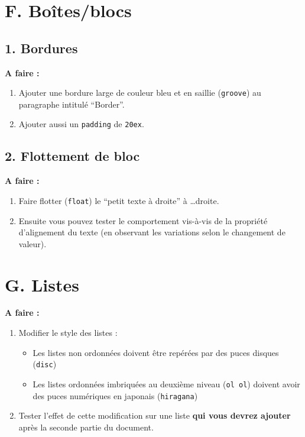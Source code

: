 \documentclass[a4paper,11pt]{article}
\begin{document}
\section{F. Boîtes/blocs}

\subsection{1. Bordures}

\begin{afaire}
\textbf{A faire :}

\begin{enumerate}
    \item Ajouter une bordure large de couleur bleu et en saillie (\textcolor{rose}{\texttt{groove}}) au paragraphe intitulé ``Border''.
    \item Ajouter aussi un \textcolor{rose}{\texttt{padding}} de \texttt{20ex}.
\end{enumerate}
\end{afaire}

\subsection{2. Flottement de bloc}

\begin{afaire}
\textbf{A faire :}

\begin{enumerate}
    \item Faire flotter (\textcolor{rose}{\texttt{float}}) le ``petit texte à droite'' à \ldots droite.
    \item Ensuite vous pouvez tester le comportement vis-à-vis de la propriété d'alignement du texte (en observant les variations selon le changement de valeur).
\end{enumerate}
\end{afaire}

\section{G. Listes}

\begin{afaire}
\textbf{A faire :}

\begin{enumerate}
    \item Modifier le style des listes :
    \begin{itemize}
        \item Les listes non ordonnées doivent être repérées par des puces disques (\textcolor{rose}{\texttt{disc}})
        \item Les listes ordonnées imbriquées au deuxième niveau (\textcolor{rose}{\texttt{ol ol}}) doivent avoir des puces numériques en japonais (\textcolor{rose}{\texttt{hiragana}})
    \end{itemize}
    \item Tester l'effet de cette modification sur une liste \textbf{qui vous devrez ajouter} après la seconde partie du document.
\end{enumerate}
\end{afaire}
\end{document}
